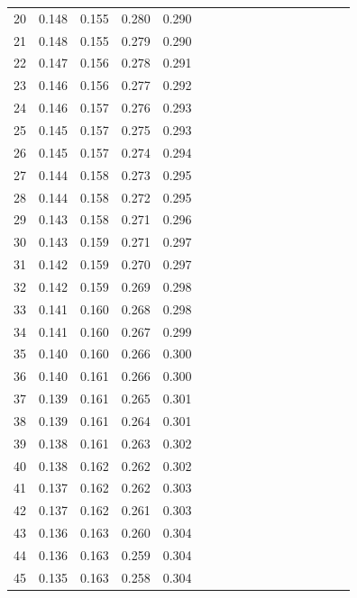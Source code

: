\documentclass{report}
\begin{document}
\begin{table}
\begin{tabular}{|c|cccc|cccc|cccc|cccc|}
20 & 0.148 & 0.155 & 0.280 & 0.290 & & & & & & & & & & & &\\
21 & 0.148 & 0.155 & 0.279 & 0.290 & & & & & & & & & & & &\\
22 & 0.147 & 0.156 & 0.278 & 0.291 & & & & & & & & & & & &\\
23 & 0.146 & 0.156 & 0.277 & 0.292 & & & & & & & & & & & &\\
24 & 0.146 & 0.157 & 0.276 & 0.293 & & & & & & & & & & & &\\
25 & 0.145 & 0.157 & 0.275 & 0.293 & & & & & & & & & & & &\\
26 & 0.145 & 0.157 & 0.274 & 0.294 & & & & & & & & & & & &\\
27 & 0.144 & 0.158 & 0.273 & 0.295 & & & & & & & & & & & &\\
28 & 0.144 & 0.158 & 0.272 & 0.295 & & & & & & & & & & & &\\
29 & 0.143 & 0.158 & 0.271 & 0.296 & & & & & & & & & & & &\\
30 & 0.143 & 0.159 & 0.271 & 0.297 & & & & & & & & & & & &\\
31 & 0.142 & 0.159 & 0.270 & 0.297 & & & & & & & & & & & &\\
32 & 0.142 & 0.159 & 0.269 & 0.298 & & & & & & & & & & & &\\
33 & 0.141 & 0.160 & 0.268 & 0.298 & & & & & & & & & & & &\\
34 & 0.141 & 0.160 & 0.267 & 0.299 & & & & & & & & & & & &\\
35 & 0.140 & 0.160 & 0.266 & 0.300 & & & & & & & & & & & &\\
36 & 0.140 & 0.161 & 0.266 & 0.300 & & & & & & & & & & & &\\
37 & 0.139 & 0.161 & 0.265 & 0.301 & & & & & & & & & & & &\\
38 & 0.139 & 0.161 & 0.264 & 0.301 & & & & & & & & & & & &\\
39 & 0.138 & 0.161 & 0.263 & 0.302 & & & & & & & & & & & &\\
40 & 0.138 & 0.162 & 0.262 & 0.302 & & & & & & & & & & & &\\
41 & 0.137 & 0.162 & 0.262 & 0.303 & & & & & & & & & & & &\\
42 & 0.137 & 0.162 & 0.261 & 0.303 & & & & & & & & & & & &\\
43 & 0.136 & 0.163 & 0.260 & 0.304 & & & & & & & & & & & &\\
44 & 0.136 & 0.163 & 0.259 & 0.304 & & & & & & & & & & & &\\
45 & 0.135 & 0.163 & 0.258 & 0.304 & & & & & & & & & & & &\\

\end{tabular}
\end{table}
\end{document}
